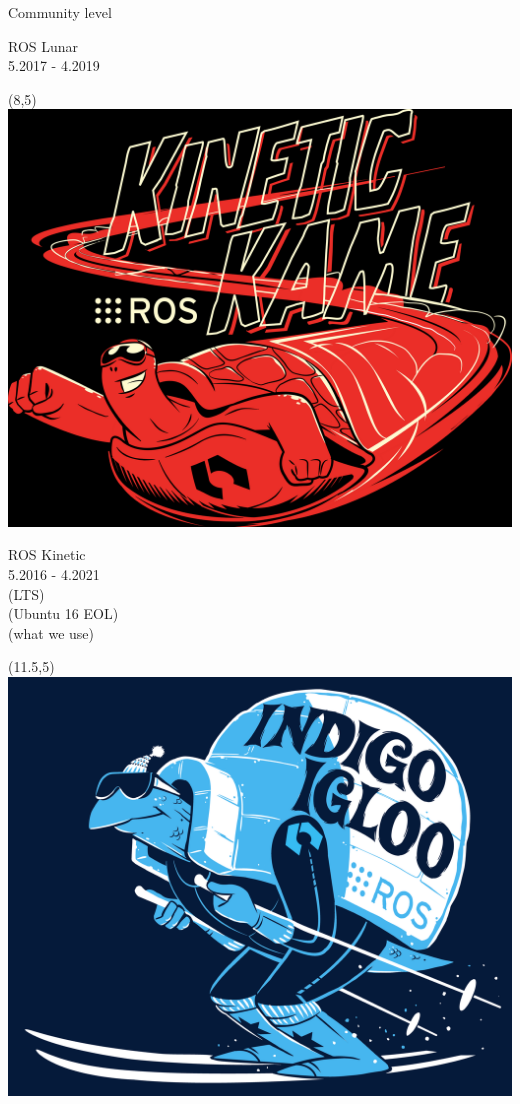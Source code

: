 \documentclass{beamer}
\begin{document}
\begin{frame}{Community level}
\begin{textblock}{3}
         \centering
         ROS Lunar\\
         \footnotesize 5.2017 - 4.2019
     \end{textblock}
     \begin{textblock}{3}(8,5)
         \includegraphics[width = 1.0\linewidth]{figures/kinetic.png}
         
         \centering
         ROS Kinetic\\
         \footnotesize 5.2016 - 4.2021\\
         (LTS)\\
         (Ubuntu 16 EOL)\\
         (what we use)
         
     \end{textblock}  
     \begin{textblock}{3}(11.5,5)
         \includegraphics[width = 1.0\linewidth]{figures/indigo.png}
         

\end{textblock}
\end{frame}
\end{document}
